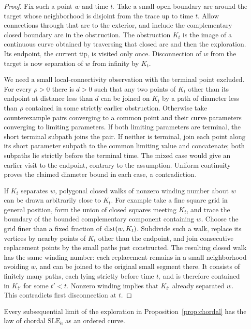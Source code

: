 \begin{proof}
Fix such a point $w$ and time $t$.  Take a small open boundary arc
around the target whose neighborhood is disjoint from the trace up
to time $t$.  Allow connections through that arc to the exterior,
and include the complementary closed boundary arc in the
obstruction.  The obstruction $K_t$ is the image of a continuous
curve obtained by traversing that closed arc and then the
exploration.  Its endpoint, the current tip, is visited only once.
Disconnection of $w$ from the target is now separation of $w$ from
infinity by $K_t$.

We need a small local-connectivity observation with the terminal
point excluded.  For every $\rho>0$ there is $d>0$ such that any
two points of $K_t$ other than its endpoint at distance less than
$d$ can be joined on $K_t$ by a path of diameter less than $\rho$
contained in some strictly earlier obstruction.  Otherwise take
counterexample pairs converging to a common point and their curve
parameters converging to limiting parameters.  If both limiting
parameters are terminal, the short terminal subpath joins the
pair.  If neither is terminal, join each point along its short
parameter subpath to the common limiting value and concatenate;
both subpaths lie strictly before the terminal time.  The mixed
case would give an earlier visit to the endpoint, contrary to the
assumption.  Uniform continuity proves the claimed diameter
bound in each case, a contradiction.

If $K_t$ separates $w$, polygonal closed walks of nonzero winding
number about $w$ can be drawn arbitrarily close to $K_t$.
For example take a fine square grid in general position, form the
union of closed squares meeting $K_t$, and trace the boundary of
the bounded complementary component containing $w$.  Choose the
grid finer than a fixed fraction of $\operatorname{dist}(w,K_t)$.  Subdivide
such a walk, replace its vertices by nearby points of $K_t$ other
than the endpoint, and join consecutive replacement points by
the small paths just constructed.  The resulting closed walk
has the same winding number: each replacement remains in a
small neighborhood avoiding $w$, and can be joined to the
original small segment there.  It consists of finitely many
paths, each lying strictly before time $t$, and is therefore
contained in $K_{t'}$ for some $t'<t$.  Nonzero winding implies
that $K_{t'}$ already separated $w$.  This contradicts first
disconnection at $t$.
\end{proof}

\begin{lemma}
\label{lem:no-hidden-excursions}
Every subsequential limit of the exploration in
Proposition~\ref{prop:chordal} has the law of chordal
$\mathrm{SLE}_6$ as an ordered curve.
\end{lemma}

